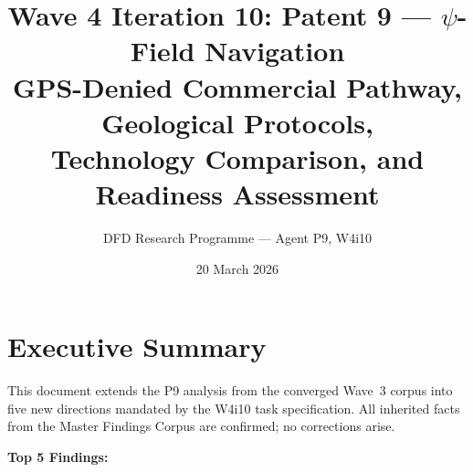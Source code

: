 \documentclass[11pt]{article}
\title{\textbf{Wave 4 Iteration 10: Patent 9 --- $\psi$-Field Navigation}\\[6pt]
GPS-Denied Commercial Pathway, Geological Protocols,\\
Technology Comparison, and Readiness Assessment}
\author{DFD Research Programme --- Agent P9, W4i10}
\date{20 March 2026}
\theoremstyle{definition}
\theoremstyle{remark}
\begin{document}
\maketitle
\tableofcontents
\newpage

\section*{Executive Summary}

This document extends the P9 analysis from the converged Wave~3 corpus into
five new directions mandated by the W4i10 task specification. All inherited
facts from the Master Findings Corpus are confirmed; no corrections arise.

\textbf{Top 5 Findings:}
\end{document}
